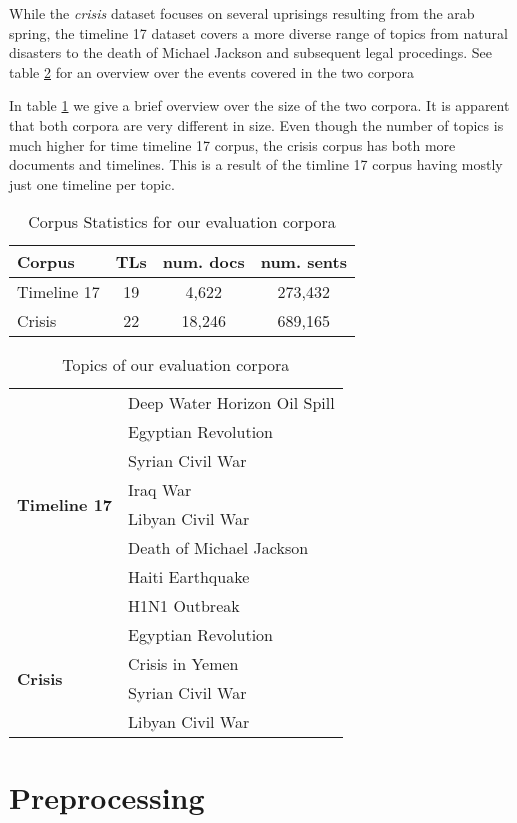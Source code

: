 \documentclass[a4paper,BCOR=10mm]{report}
\numberwithin{lemma}{chapter}
\numberwithin{definition}{chapter}
\begin{document}
While the \textit{crisis} dataset focuses on several uprisings resulting from the arab spring, the timeline 17 dataset covers a more diverse range of topics from natural disasters to the death of Michael Jackson and subsequent legal procedings. See table \ref{tab:corpus-topics} for an overview over the events covered in the two corpora

In table \ref{tab:corpus-stats} we give a brief overview over the size of the two corpora. It is apparent that both corpora are very different in size. Even though the number of topics is much higher for time timeline 17 corpus, the crisis corpus has both more documents and timelines. This is a result of the timline 17 corpus having mostly just one timeline per topic.

\begin{table}
\begin{tabular}{|l|ccc|}
\hline
Corpus &TLs & num. docs & num. sents \\\hline
Timeline 17 & 19 & 4,622 & 273,432 \\
Crisis & 22 & 18,246 & 689,165 \\\hline
\end{tabular}
\caption{Corpus Statistics for our evaluation corpora}
\label{tab:corpus-stats}
\end{table}

\begin{table}
\begin{tabular}{|l|l|}
\hline
\multirow{8}{*}{\textbf{Timeline 17}} & Deep Water Horizon Oil Spill \\
& Egyptian Revolution \\
& Syrian Civil War \\
& Iraq War \\
& Libyan Civil War \\
& Death of Michael Jackson \\
& Haiti Earthquake \\
& H1N1 Outbreak \\\hline\hline
\multirow{4}{*}{\textbf{Crisis}} & Egyptian Revolution \\
& Crisis in Yemen \\
& Syrian Civil War \\
& Libyan Civil War \\\hline
\end{tabular}
\caption{Topics of our evaluation corpora}
\label{tab:corpus-topics}
\end{table}

\section{Preprocessing}
\end{document}
